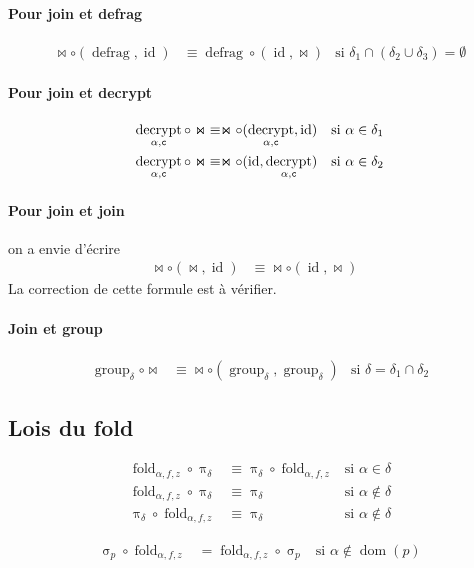\documentclass[french]{article}
\DeclareMathOperator{\proj}{\pi}
\DeclareMathOperator{\sel}{\sigma}
\DeclareMathOperator{\defrag}{defrag}
\DeclareMathOperator{\decrypt}{decrypt}
\DeclareMathOperator{\group}{group}
\DeclareMathOperator{\id}{id}
\DeclareMathOperator{\dom}{dom}
\newcommand\typeT[1]{\text{\ttfamily #1}}
\newcommand{\decryptArgs}[2]{\decrypt_{#1 , \typeT{#2}}}
\newcommand{\projDelta}{\proj_{\delta}}
\newcommand{\selP}{\sel_p}
\newcommand{\decryptCAlpha}{\decryptArgs{\alpha}{c}}
\newcommand{\groupDelta}{\group_{\delta}}
\newcommand{\fold}[3]{\operatorname{fold}_{#1, #2, #3}}
\newcommand{\foldAlphafz}{\fold{\alpha}{f}{z}}
\begin{document}
\paragraph{Pour join et defrag} 
\begin{align}
\Join \circ (\defrag, \id)
& \equiv
 \defrag \circ (\id, \Join)
& \text{si $\delta_1 \cap (\delta_2 \cup \delta_3) = \emptyset$}
\end{align}

\paragraph{Pour join et decrypt}
\begin{align}
\decryptCAlpha \circ \Join
& \equiv
\Join \circ (\decryptCAlpha, \id)
& \text{si $\alpha \in \delta_1$} \\
\decryptCAlpha \circ \Join
& \equiv
\Join \circ (\id, \decryptCAlpha)
& \text{si $\alpha \in \delta_2$} 
\end{align}

\paragraph{Pour join et join} on a envie d'écrire
\begin{align}
\Join \circ (\Join, \id)
& \equiv \Join \circ (\id, \Join) &
\end{align}
La correction de cette formule est à vérifier.

\paragraph{Join et group}
\begin{align}
\groupDelta \circ \Join
& \equiv \Join \circ (\groupDelta, \groupDelta)
& \text{si $\delta = \delta_1 \cap \delta_2$}
\end{align}


\subsection*{Lois du fold}
\begin{align}
\foldAlphafz \circ \projDelta
& \equiv \projDelta \circ \foldAlphafz
& \text{si $\alpha \in \delta$} \\
\foldAlphafz \circ \projDelta
& \equiv \projDelta
& \text{si $\alpha \notin \delta$} \\
\projDelta \circ \foldAlphafz
& \equiv \projDelta
& \text{si $\alpha \notin \delta$}
\end{align}

\begin{align}
\selP \circ \foldAlphafz & = \foldAlphafz \circ \selP
& \text{si $\alpha \notin \dom(p)$}
\end{align}
\end{document}
